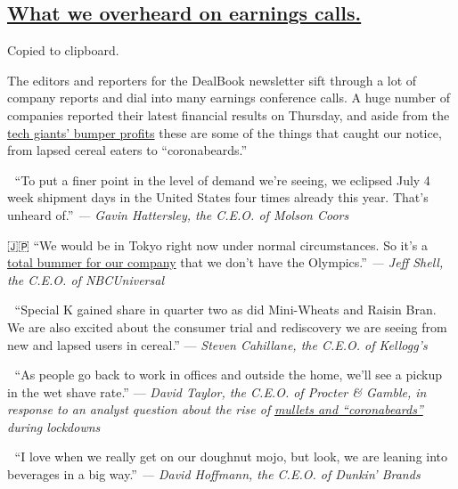 \hypertarget{what-we-overheard-on-earnings-calls}{%
\subsection{\texorpdfstring{\protect\hyperlink{what-we-overheard-on-earnings-calls}{What
we overheard on earnings
calls.}}{What we overheard on earnings calls.}}\label{what-we-overheard-on-earnings-calls}}

Copied to clipboard.

The editors and reporters for the DealBook newsletter sift through a lot
of company reports and dial into many earnings conference calls. A huge
number of companies reported their latest financial results on Thursday,
and aside from the
\href{https://www.nytimes.com/2020/07/30/technology/tech-company-earnings-amazon-apple-facebook-google.htmlhttps://www.nytimes.com/2020/07/31/business/dealbook/tech-earnings-economy.html}{tech
giants' bumper profits} these are some of the things that caught our
notice, from lapsed cereal eaters to ``coronabeards.''

🍺 ``To put a finer point in the level of demand we're seeing, we
eclipsed July 4 week shipment days in the United States four times
already this year. That's unheard of.'' \emph{--- Gavin Hattersley, the
C.E.O. of Molson Coors}

🇯🇵 ``We would be in Tokyo right now under normal circumstances. So it's
a
\href{https://www.nytimes.com/live/2020/07/30/business/stock-market-today-coronavirus/comcast-saw-10-million-sign-ups-for-its-streaming-service-peacock}{total
bummer for our company} that we don't have the Olympics.'' \emph{---
Jeff Shell, the C.E.O. of NBCUniversal}

🥣 ``Special K gained share in quarter two as did Mini-Wheats and Raisin
Bran. We are also excited about the consumer trial and rediscovery we
are seeing from new and lapsed users in cereal.'' --- \emph{Steven
Cahillane, the C.E.O. of Kellogg's}

🧔 ``As people go back to work in offices and outside the home, we'll see
a pickup in the wet shave rate.'' --- \emph{David Taylor, the C.E.O. of
Procter \& Gamble, in response to an analyst question about the rise of}
\href{https://www.nytimes.com/2020/07/30/business/coronabeards-aside-procter-gamble-saw-strong-sales.html}{\emph{mullets
and ``coronabeards''}} \emph{during lockdowns}

🍩 ``I love when we really get on our doughnut mojo, but look, we are
leaning into beverages in a big way.'' \emph{--- David Hoffmann, the
C.E.O. of Dunkin' Brands}

